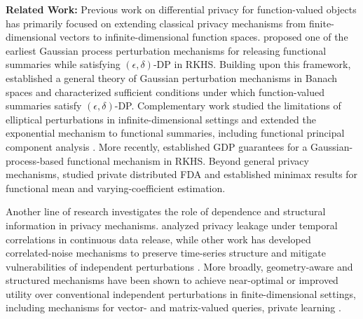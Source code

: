 \documentclass[twoside,11pt]{article}
\begin{document}
\textbf{Related Work:} Previous work on differential privacy for function-valued objects has primarily focused on extending classical privacy mechanisms from finite-dimensional vectors to infinite-dimensional function spaces. \citet{hall2013differential} proposed one of the earliest Gaussian process perturbation mechanisms for releasing functional summaries while satisfying $(\epsilon,\delta)$-DP in RKHS. Building upon this framework, \citet{mirshani2019formal} established a general theory of Gaussian perturbation mechanisms in Banach spaces and characterized sufficient conditions under which function-valued summaries satisfy $(\epsilon,\delta)$-DP. Complementary work studied the limitations of elliptical perturbations in infinite-dimensional settings \citep{reimherr2019elliptical} and extended the exponential mechanism to functional summaries, including functional principal component analysis \citep{awan2019benefits}. More recently, \citet{raisa2024noise} established GDP guarantees for a Gaussian-process-based functional mechanism in RKHS. Beyond general privacy mechanisms, \citet{xue2024optimal} studied private distributed FDA and established minimax results for functional mean and varying-coefficient estimation. %

Another line of research investigates the role of dependence and structural information in privacy mechanisms. \citet{cao2018quantifying} analyzed privacy leakage under temporal correlations in continuous data release, while other work has developed correlated-noise mechanisms to preserve time-series structure and mitigate vulnerabilities of independent perturbations \citep{wang2017cts,mcelroy2023flip}. More broadly, geometry-aware and structured mechanisms have been shown to achieve near-optimal or improved utility over conventional independent perturbations in finite-dimensional settings, including mechanisms for vector- and matrix-valued queries, private learning \citep{nikolov2013geometry, chanyaswad2018mvg, awan2021structure, choquette2024correlated}. 
\end{document}
